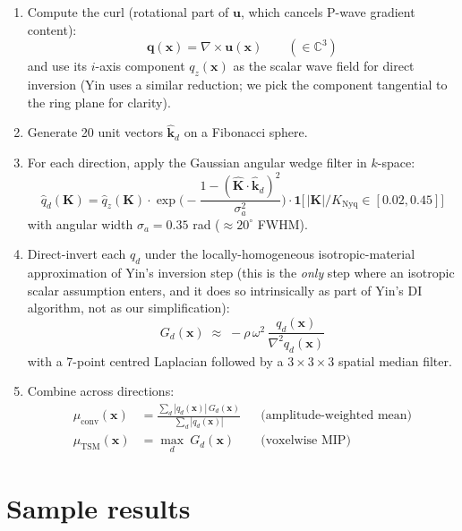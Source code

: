 \documentclass[11pt,letterpaper]{article}
\newcommand{\vect}[1]{\boldsymbol{#1}}
\newcommand{\ihat}{\hat{\boldsymbol{k}}}
\begin{document}
\begin{enumerate}
\item Compute the curl (rotational part of $\vect u$, which cancels
P-wave gradient content):
\begin{equation}
\vect q(\vect x) = \nabla \times \vect u(\vect x)
\qquad (\in \mathbb{C}^3)
\end{equation}
and use its $i$-axis component $q_z(\vect x)$ as the scalar wave
field for direct inversion (Yin uses a similar reduction; we pick the
component tangential to the ring plane for clarity).

\item Generate 20 unit vectors $\ihat_d$ on a Fibonacci sphere.

\item For each direction, apply the Gaussian angular wedge filter
in $k$-space:
\begin{equation}
\hat q_d(\vect K) = \hat q_z(\vect K)\cdot
\exp\!\biggl(-\frac{1 - (\hat{\vect K}\cdot \ihat_d)^2}{\sigma_a^2}\biggr)
\cdot \mathbf{1}\!\bigl[\,|\vect K|/K_{\text{Nyq}} \in [0.02, 0.45]\bigr]
\end{equation}
with angular width $\sigma_a = 0.35$ rad ($\approx 20^\circ$ FWHM).

\item Direct-invert each $q_d$ under the locally-homogeneous
isotropic-material approximation of Yin's inversion step (this is
the \emph{only} step where an isotropic scalar assumption enters,
and it does so intrinsically as part of Yin's DI algorithm, not as
our simplification):
\begin{equation}
G_d(\vect x) \;\approx\; -\rho\,\omega^2 \,\frac{q_d(\vect x)}{\nabla^2 q_d(\vect x)}
\end{equation}
with a 7-point centred Laplacian followed by a
3\,$\times$\,3\,$\times$\,3 spatial median filter.

\item Combine across directions:
\begin{align}
\mu_{\text{conv}}(\vect x) &= \frac{\sum_d |q_d(\vect x)|\,G_d(\vect x)}{\sum_d |q_d(\vect x)|}
&&\text{(amplitude-weighted mean)}\\
\mu_{\text{TSM}}(\vect x)  &= \max_{d}\ G_d(\vect x)
&&\text{(voxelwise MIP)}
\end{align}
\end{enumerate}

\section{Sample results}
\end{document}
